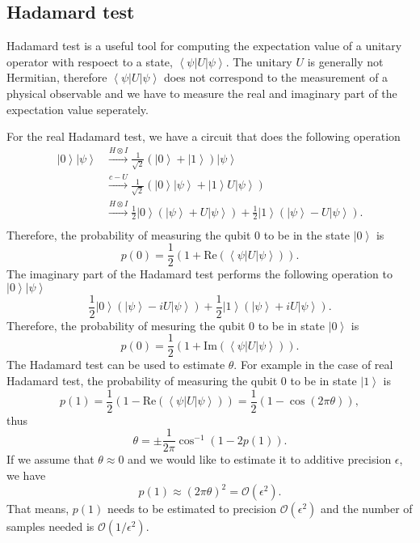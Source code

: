 \documentclass[11pt]{article}
\newcommand{\bra}[1]{\left\langle #1\right|}
\newcommand{\ket}[1]{\left|#1\right\rangle}
\begin{document}
\subsection{Hadamard test}
Hadamard test is a useful tool for computing the expectation value of a unitary operator with respoect to a state, $\bra{\psi}U\ket{\psi}$. The unitary $U$ is generally not Hermitian, therefore $\bra{\psi}U\ket{\psi}$ does not correspond to the measurement of a physical observable and we have to measure the real and imaginary part of the expectation value seperately. 

For the real Hadamard test, we have a circuit that does the following operation 
\begin{align}
    \ket{0}\ket{\psi} &\xrightarrow{H\otimes I}\frac{1}{\sqrt{2}}(\ket{0} + \ket{1})\ket{\psi} \nonumber \\
    &\xrightarrow{c-U}\frac{1}{\sqrt{2}}(\ket{0}\ket{\psi} + \ket{1}U\ket{\psi}) \nonumber \\
    &\xrightarrow{H\otimes I}\frac{1}{2}\ket{0}(\ket{\psi} + U\ket{\psi}) + \frac{1}{2}\ket{1}(\ket{\psi} - U\ket{\psi}).\nonumber \\
\end{align}
Therefore, the probability of measuring the qubit 0 to be in the state $\ket{0}$ is 
\begin{equation}
    p(0) = \frac{1}{2}(1 + \text{Re}(\bra{\psi}U\ket{\psi})).
\end{equation}
The imaginary part of the Hadamard test performs the following operation to $\ket{0}\ket{\psi}$ 
\begin{equation}
    \frac{1}{2}\ket{0}(\ket{\psi} - iU\ket{\psi}) + \frac{1}{2}\ket{1}(\ket{\psi} + iU\ket{\psi}).
\end{equation}
Therefore, the probability of mesuring the  qubit 0 to be in state $\ket{0}$ is 
\begin{equation}
    p(0) = \frac{1}{2}(1 + \text{Im}(\bra{\psi}U\ket{\psi})).
\end{equation}
The Hadamard test can be used to estimate $\theta$. For example in the case of real Hadamard test, the probability of measuring the qubit 0 to be in state $\ket{1}$ is 
\begin{equation}
    p(1) = \frac{1}{2}(1 - \text{Re}(\bra{\psi}U\ket{\psi})) = \frac{1}{2}(1 - \cos(2\pi\theta)),
\end{equation}
thus 
\begin{equation}
    \theta = \pm\frac{1}{2\pi}\cos^{-1}(1 - 2p(1)).
\end{equation}
If we assume that $\theta\approx 0$ and we would like to estimate it to additive precision $\epsilon$, we have 
\begin{equation}
    p(1)\approx(2\pi\theta)^2=\mathcal{O}(\epsilon^2).
\end{equation}
That means, $p(1)$ needs to be estimated to precision $\mathcal{O}(\epsilon^2)$ and the number of samples needed is $\mathcal{O}(1/\epsilon^2)$.



\end{document}
